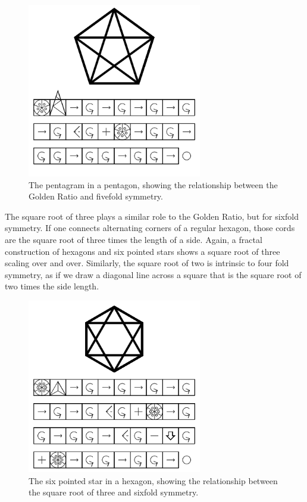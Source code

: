 \begin{figure}
	\centering
	\includegraphics[width=3in]{figures/symbol/pentagram.png}
	\caption[pentagram]
	{The pentagram in a pentagon, showing the relationship between the Golden Ratio and fivefold symmetry.}
\end{figure}


The square root of three plays a similar role to the Golden Ratio, but for sixfold symmetry.  If one connects alternating corners of a regular hexagon, those cords are the square root of three times the length of a side.  Again, a fractal construction of hexagons and six pointed stars shows a square root of three scaling over and over.  Similarly, the square root of two is intrinsic to four fold symmetry, as if we draw a diagonal line across a square that is the square root of two times the side length.  

\begin{figure}
	\centering
	\includegraphics[width=3in]{figures/symbol/hexagram.png}
	\caption[hexagram]
	{The six pointed star in a hexagon, showing the relationship between the square root of three and sixfold symmetry.}
\end{figure}


